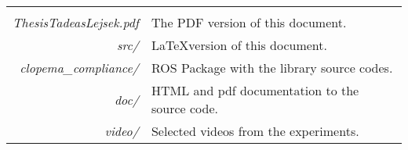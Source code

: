 %
 \label{sec:appendix}
    \begin{tabular}{rl}
    & \\[.5cm]
      \textit{ThesisTadeasLejsek.pdf} & The PDF version of this document.\\
        \textit{src/} & \LaTeX version of this document.\\       
        \textit{clopema\_compliance/} & ROS Package with the library source codes.\\
        \textit{doc/} & HTML and pdf documentation to the source code.\\         
        \textit{video/} & Selected videos from the experiments.\\
    \end{tabular}
    \clearpage

    